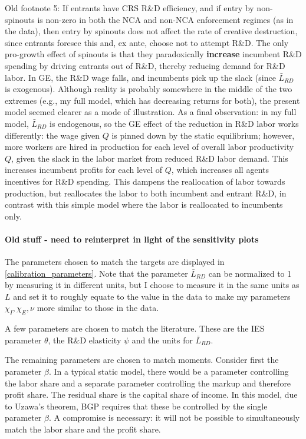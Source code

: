 \documentclass[11pt,english]{article}
\theoremstyle{remark}
\begin{document}
Old footnote 5: If entrants have CRS R\&D efficiency, and if entry by non-spinouts is non-zero in both the NCA and non-NCA enforcement regimes (as in the data), then entry by spinouts does not affect the rate of creative destruction, since entrants foresee this and, ex ante, choose not to attempt R\&D. The only pro-growth effect of spinouts is that they paradoxically \textbf{increase} incumbent R\&D spending by driving entrants out of R\&D, thereby reducing demand for R\&D labor. In GE, the R\&D wage falls, and incumbents pick up the slack (since $\bar{L}_{RD}$ is exogenous). Although reality is probably somewhere in the middle of the two extremes (e.g., my full model, which has decreasing returns for both), the present model seemed clearer as a mode of illustration. As a final observation: in my full model, $\bar{L}_{RD}$ is endogenous, so the GE effect of the reduction in R\&D labor works differently: the wage given $Q$ is pinned down by the static equilibrium; however, more workers are hired in production for each level of overall labor productivity $Q$, given the slack in the labor market from reduced R\&D labor demand. This increases incumbent profits for each level of $Q$, which increases all agents incentives for R\&D spending. This dampens the reallocation of labor towards production, but reallocates the labor to both incumbent and entrant R\&D, in contrast with this simple model where the labor is reallocated to incumbents only.



\paragraph{Old stuff - need to reinterpret in light of the sensitivity plots}

The parameters chosen to match the targets are displayed in \autoref{calibration_parameters}. Note that the parameter $\bar{L}_{RD}$ can be normalized to 1 by measuring it in different units, but I choose to measure it in the same units as $L$ and set it to roughly equate to the value in the data to make my parameters $\chi_I,\chi_E,\nu$ more similar to those in the data. 

A few parameters are chosen to match the literature. These are the IES parameter $\theta$, the R\&D elasticity $\psi$ and the units for $\bar{L}_{RD}$. 

The remaining parameters are chosen to match moments. Consider first the parameter $\beta$. In a typical static model, there would be a parameter controlling the labor share and a separate parameter controlling the markup and therefore profit share. The residual share is the capital share of income. In this model, due to Uzawa's theorem, BGP requires that these be controlled by the single parameter $\beta$. A compromise is necessary: it will not be possible to simultaneously match the labor share and the profit share. 
\end{document}
